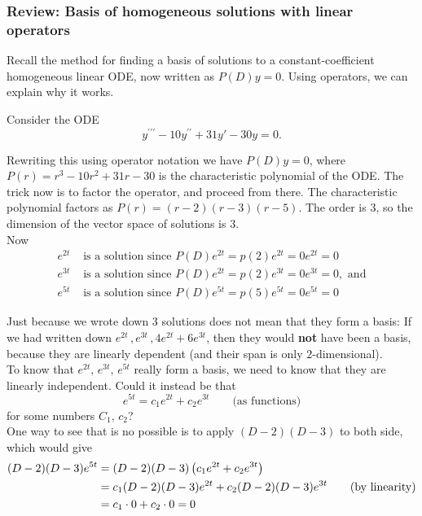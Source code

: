\subsubsection{Review: Basis of homogeneous solutions with linear operators}
Recall the method for finding a basis of solutions to a constant-coefficient homogeneous linear ODE, now written as $P(D)y=0$. Using operators, we can explain why it works.
\begin{example}
  Consider the ODE
  \begin{equation*}
    y^{\prime \prime \prime } - 10 y^{\prime \prime } + 31y'-30y = 0.
  \end{equation*}
\end{example}
Rewriting this using operator notation we have $P(D)y = 0$, where $P(r) = r^3-10r^2+31r-30$
is the characteristic polynomial of the ODE.
The trick now is to factor the operator, and proceed from there.
The characteristic polynomial factors as $P(r) = (r-2)(r-3)(r-5)$.
The order is $3$, so the dimension of the vector space of solutions is $3$.\\

Now
\begin{align*}
  e^{2t} &\text{  is a solution since } P(D) e^{2t} = p(2) e^{2t} = 0 e^{2t} = 0 \\
  e^{3t} &\text{  is a solution since } P(D) e^{2t} = p(2) e^{3t} = 0 e^{3t} = 0 , \text{ and}\\
  e^{5t} &\text{  is a solution since } P(D) e^{5t} = p(5) e^{5t} = 0 e^{5t} = 0 
\end{align*}

Just because we wrote down $3$ solutions does not mean that they form a basis:
If we had written down $e^{2t}\, , e^{3t}\, , 4e^{2t} + 6e^{3t}$, 
then they would \textbf{not} have been a basis, because they are linearly dependent
(and their span is only $2$-dimensional).\\

To know that $e^{2t}, \, e^{3t} , \, e^{5t}$ really form a basis,
we need to know that they are {\color{orange}linearly independent.}
Could it instead be that
\begin{equation*}
  e^{5t} = c_1 e^{2t}+c_2 e^{3t} \qquad \text{(as functions)}
\end{equation*}
for some numbers $C_1, \, c_2$? \\

One way to see that is no possible is to apply $(D-2)(D-3)$ to both side,
which would give
\begin{align*}
  \displaystyle  \displaystyle (D-2)(D-3)e^{5t}
  \displaystyle &= \displaystyle  (D-2)(D-3)\left( c_1 e^{2t} + c_2 e^{3t} \right) \\
  \displaystyle &= \displaystyle  c_1(D-2)(D-3)e^{2t} + c_2 (D-2)(D-3) e^{3t}
                  \qquad \text {(by linearity)} \\
  \displaystyle &= \displaystyle  c_1\cdot 0 + c_2 \cdot 0 = 0  
\end{align*}

